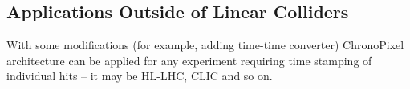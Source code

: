 \subsection{Applications Outside of Linear Colliders}
     With some modifications (for example, adding time-time converter) ChronoPixel architecture can be applied for any experiment requiring time stamping of individual hits -- it may be HL-LHC, CLIC and so on.
